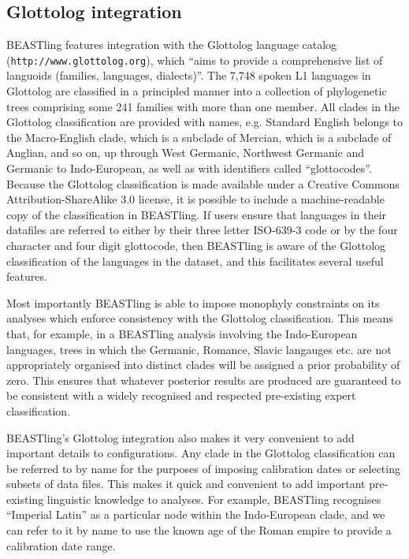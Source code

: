 \documentclass[twocolumn,10pt]{scrartcl}
\begin{document}
\subsection{Glottolog integration}

BEASTling features integration with the Glottolog language catalog (\texttt{http://www.glottolog.org}), which ``aims to provide a comprehensive list of languoids (families, languages, dialects)''.  The 7,748 spoken L1 languages in Glottolog are classified in a principled manner into a collection of phylogenetic trees comprising some 241 families with more than one member.  All clades in the Glottolog classification are provided with names, e.g. Standard English belongs to the Macro-English clade, which is a subclade of Mercian, which is a subclade of Anglian, and so on, up through West Germanic, Northwest Germanic and Germanic to Indo-European, as well as with identifiers called ``glottocodes''.  Because the Glottolog classification is made available under a Creative Commons Attribution-ShareAlike 3.0 license, it is possible to include a machine-readable copy of the classification in BEASTling.  If users ensure that languages in their datafiles are referred to either by their three letter ISO-639-3 code or by the four character and four digit glottocode, then BEASTling is aware of the Glottolog classification of the languages in the dataset, and this facilitates several useful features.

Most importantly BEASTling is able to impose monophyly constraints on its analyses which enforce consistency with the Glottolog classification.  This means that, for example, in a BEASTling analysis involving the Indo-European languages, trees in which the Germanic, Romance, Slavic langauges etc. are not appropriately organised into distinct clades will be assigned a prior probability of zero.  This ensures that whatever posterior results are produced are guaranteed to be consistent with a widely recognised and respected pre-existing expert classification.

BEASTling's Glottolog integration also makes it very convenient to add important details to configurations.  Any clade in the Glottolog classification can be referred to by name for the purposes of imposing calibration dates or selecting subsets of data files.  This makes it quick and convenient to add important pre-existing linguistic knowledge to analyses.  For example, BEASTling recognises ``Imperial Latin'' as a particular node within the Indo-European clade, and we can refer to it by name to use the known age of the Roman empire to provide a calibration date range.
\end{document}
